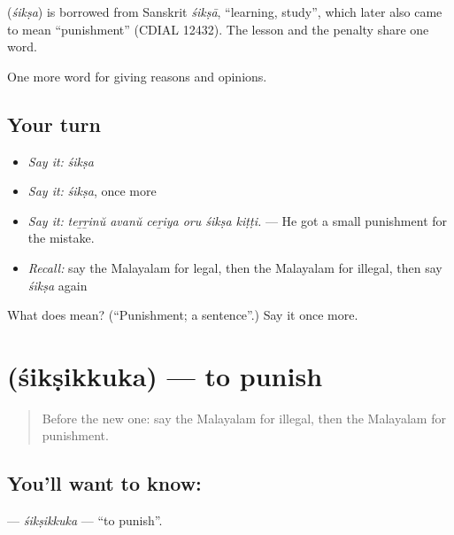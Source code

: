 \begin{cousinweb}
\textbf{} (\emph{śikṣa}) is borrowed from Sanskrit \emph{śikṣā}, \textquotedblleft{}learning, study\textquotedblright{}, which later also came to mean \textquotedblleft{}punishment\textquotedblright{} (CDIAL 12432). The lesson and the penalty share one word.
\end{cousinweb}

\begin{grammarlens}[title={What you've built}]
One more word for giving reasons and opinions.
\end{grammarlens}

\subsection*{Your turn}
\begin{itemize}
\raggedright
  \item \emph{Say it:} \emph{śikṣa}
  \item \emph{Say it:} \emph{śikṣa}, once more
  \item \emph{Say it:} \emph{teṟṟinŭ avanŭ ceṟiya oru śikṣa kiṭṭi.} — He got a small punishment for the mistake.
  \item \emph{Recall:} say the Malayalam for legal, then the Malayalam for illegal, then say \emph{śikṣa} again
\end{itemize}

\begin{tcolorbox}[breakable,colback=teal!4,colframe=teal!35!black,title={Before you move on}]
What does  mean? (\textquotedblleft{}Punishment; a sentence\textquotedblright{}.) Say it once more.
\end{tcolorbox}
\section[\texorpdfstring{\ml{ശിക്ഷിക്കുക} (śikṣikkuka)}{ശിക്ഷിക്കുക (śikṣikkuka)}]{ (śikṣikkuka) — to punish}

\label{lesson:ML-C418-siksikkuka}



\begin{quote}
Before the new one: say the Malayalam for illegal, then the Malayalam for punishment.
\end{quote}

\subsection*{You'll want to know: }
\textbf{} — \emph{śikṣikkuka} — \textquotedblleft{}to punish\textquotedblright{}.


